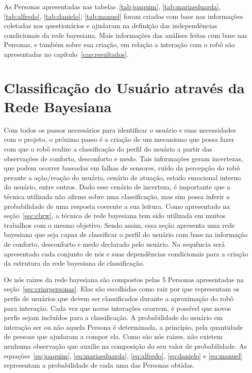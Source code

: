 As Personas apresentadas nas tabelas~\ref{tab:joaquim}, \ref{tab:mariaeduarda}, \ref{tab:alfredo}, \ref{tab:danielo}, \ref{tab:manuel} foram criadas com base nas informações coletadas nos questionários e ajudaram na definição das independências condicionais da rede bayesiana. Mais informações das análises feitas com base nas Personas, e também sobre sua criação, em relação a interação com o robô são apresentadas no capítulo~\ref{cap:resultados}.

\section{Classificação do Usuário através da Rede Bayesiana}
\label{sec:rede-bayesiana}

Com todos os passos necessários para identificar o usuário e suas necessidades com o projeto, o próximo passo é a criação de um mecanismo que possa fazer com que o robô realize a classificação do perfil do usuário a partir das observações de conforto, desconforto e medo. Tais informações geram incertezas, que podem ocorrer baseadas em falhas de sensores, ruído da percepção do robô perante a ação/reação do usuário, cenário de atuação, estado emocional interno do usuário, entre outros. Dado esse cenário de incerteza, é importante que a técnica utilizada não afirme sobre uma classificação, mas sim possa inferir a probabilidade de uma resposta coerente a sua leitura. Como apresentado na seção~\ref{sec:cbrw}, a técnica de rede bayesiana tem sido utilizada em muitos trabalhos com o mesmo objetivo. Sendo assim, essa seção apresenta uma rede bayesiana que seja capaz de classificar o perfil do usuário com base na informação de conforto, desconforto e medo declarado pelo usuário. Na sequência será apresentado cada conjunto de nós e suas dependências condicionais para a criação da estrutura da rede bayesiana de classificação.

Os nós raizes da rede bayesiana são compostos pelas 5 Personas apresentadas na seção~\ref{sec:criarpersonas}. Elas são escolhidas como raiz por que representam os perfis de usuários que devem ser classificados durante a aproximação do robô para interação. Cada vez que novas interações ocorrem, é possível que novos perfis sejam incluídos para a classificação. A probabilidade do usuário em interação ser ou não aquela Persona é determinada, a princípio, pela quantidade de pessoas que ajudaram a compor ela. Como são nós raizes, não existem nenhuma observação que auxilie na composição do seu valor de probabilidade. As equações~\ref{eq:joaquim}, \ref{eq:mariaeduarda}, \ref{eq:alfredo}, \ref{eq:danielo} e \ref{eq:manuel} representam a probabilidade de cada uma das Personas obtidas.


